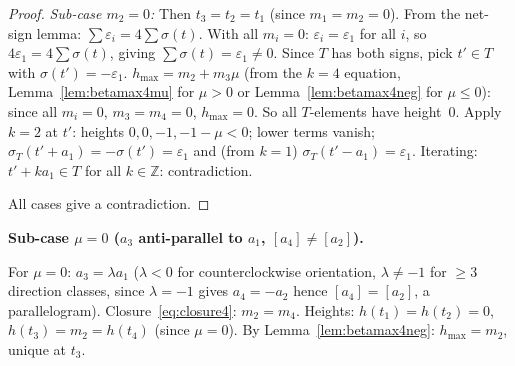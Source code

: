 \documentclass{article}
\begin{document}
\begin{proof}
\textit{Sub-case $m_2=0$:}
Then $t_3=t_2=t_1$ (since $m_1=m_2=0$).
From the net-sign lemma: $\sum\varepsilon_i=4\sum\sigma(t)$.
With all $m_i=0$: $\varepsilon_i=\varepsilon_1$ for all $i$, so $4\varepsilon_1=4\sum\sigma(t)$,
giving $\sum\sigma(t)=\varepsilon_1\ne 0$.
Since $T$ has both signs, pick $t'\in T$ with $\sigma(t')=-\varepsilon_1$.
$h_{\max}=m_2+m_3\mu$ (from the $k=4$ equation, Lemma~\ref{lem:betamax4mu} for $\mu>0$
or Lemma~\ref{lem:betamax4neg} for $\mu\le 0$): since all $m_i=0$, $m_3=m_4=0$, $h_{\max}=0$.
So all $T$-elements have height~$0$.  Apply $k=2$ at $t'$:
heights $0,0,-1,-1-\mu<0$; lower terms vanish; $\sigma_T(t'+a_1)=-\sigma(t')=\varepsilon_1$
and (from $k=1$) $\sigma_T(t'-a_1)=\varepsilon_1$.
Iterating: $t'+ka_1\in T$ for all $k\in\mathbb{Z}$: contradiction.

All cases give a contradiction.
\end{proof}

\medskip
\noindent\textbf{Sub-case $\mu=0$ ($a_3$ anti-parallel to $a_1$, $[a_4]\ne[a_2]$).}

For $\mu=0$: $a_3=\lambda a_1$ ($\lambda<0$ for counterclockwise orientation, $\lambda\ne -1$
for $\ge 3$ direction classes, since $\lambda=-1$ gives $a_4=-a_2$ hence $[a_4]=[a_2]$,
a parallelogram).
Closure~\eqref{eq:closure4}: $m_2=m_4$.
Heights: $h(t_1)=h(t_2)=0$, $h(t_3)=m_2=h(t_4)$ (since $\mu=0$).
By Lemma~\ref{lem:betamax4neg}: $h_{\max}=m_2$, unique at $t_3$.
\end{document}
